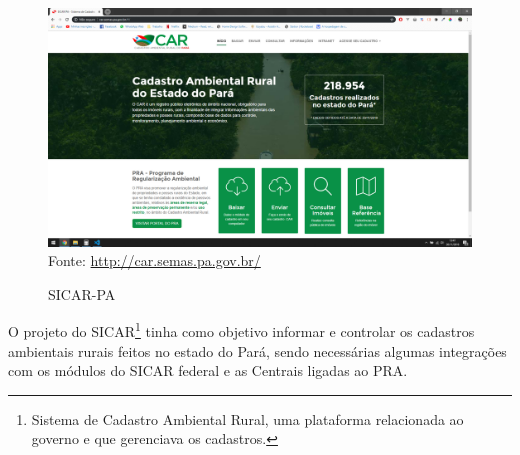 \begin{figure}[H]
\centering
\caption{SICAR-PA} %
\includegraphics[scale=0.3]{SICAR}\\  %
{\small Fonte: \url{http://car.semas.pa.gov.br/}} %
\label{fig:exemplo} %
\end{figure}

O projeto do SICAR\footnote{Sistema de Cadastro Ambiental Rural, uma plataforma relacionada ao governo e que gerenciava os cadastros.} tinha como objetivo informar e controlar os cadastros ambientais rurais feitos no estado do Pará, sendo necessárias algumas integrações com os módulos do SICAR federal e as Centrais ligadas ao PRA.

